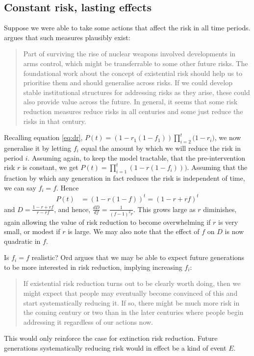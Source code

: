 \documentclass[british]{article}
\begin{document}
\subsection{Constant risk, lasting effects}\label{cr-le}
Suppose we were able to take some actions that affect the risk in all time periods. \cite{ord_modelling_2014} argues that such measures plausibly exist:

\begin{quote}
Part of surviving the rise of nuclear weapons involved developments in
arms control, which might be transferrable to some other future risks.
The foundational work about the concept of existential risk should help
us to prioritise them and should generalise across risks. If we could
develop stable institutional structures for addressing risks as they
arise, these could also provide value across the future. In general, it
seems that some risk reduction measures reduce risks in all centuries
and some just reduce the risks in that century.
\end{quote}

Recalling equation \ref{eq:dr}, $P(t) =  (1-r_1(1-f_1)) \prod_{i=2}^t {(1-r_i})$, we now generalise it by letting $f_i$ equal the amount by which we will reduce the risk in period $i$. Assuming again, to keep the model tractable, that the pre-intervention risk $r$ is constant, we get $P(t) = \prod_{i=1}^t {(1-r(1-f_i))})$. Assuming that the fraction by which any generation in fact reduces the risk is independent of time, we can say $f_i = f$. Hence
\begin{align*}
P(t) &= (1-r(1-f))^t = (1-r+rf)^t
\end{align*}
and $D= \frac{1-r+rf}{r-rf}$, and hence, $\frac{dD}{df}=\frac{1}{(f-1)^2r}$. This grows large as \(r\) diminishes, again allowing the value of risk reduction to become overwhelming if $r$ is very small, or modest if $r$ is large. We may also note that the effect of $f$ on $D$ is now quadratic in $f$.

Is $f_i = f$ realistic? Ord argues that we may be able to expect future generations to be more interested in risk reduction, implying increasing $f_i$:
\begin{quote}
If existential risk reduction turns out to be clearly worth doing, then
we might expect that people may eventually become convinced of this and
start systematically reducing it. If so, there might be much more risk
in the coming century or two than in the later centuries where people
begin addressing it regardless of our actions now.
\end{quote}
This would only reinforce the case for extinction risk reduction. Future generations systematically reducing risk would in effect be a kind of event $E$.
\end{document}
